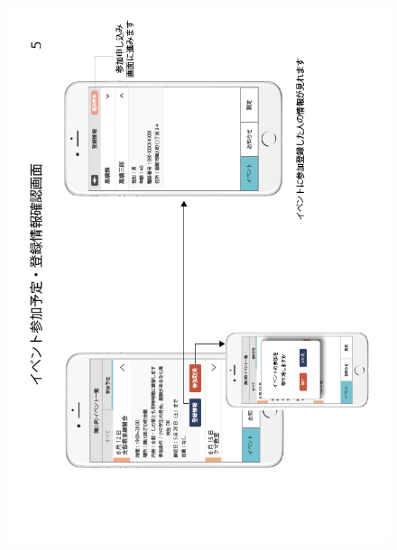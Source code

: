 \begin{figure}[h]
    \begin{center}
      \includegraphics[keepaspectratio, scale=0.7]{appendixs/appendixB_figres/fig5.png}
    \end{center}
\end{figure}

